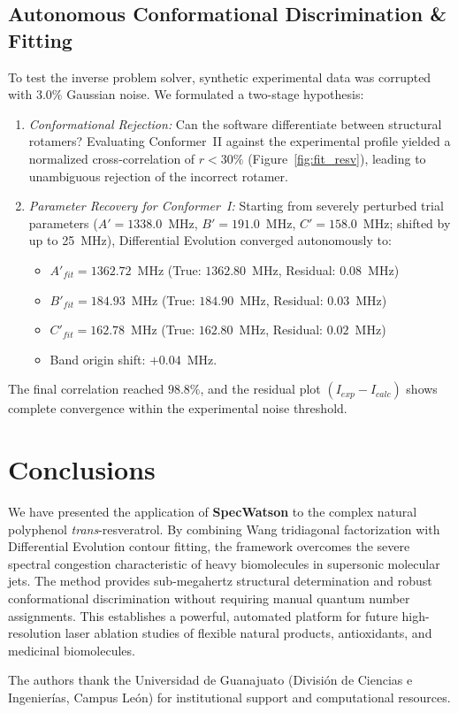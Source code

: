 \documentclass[aps,jcp,reprint,twocolumn,superscriptaddress,showpacs,amsmath,amssymb]{revtex4-2}
\begin{document}
\subsection{Autonomous Conformational Discrimination \& Fitting}
To test the inverse problem solver, synthetic experimental data was corrupted with $3.0\%$ Gaussian noise. We formulated a two-stage hypothesis:
\begin{enumerate}
    \item \textit{Conformational Rejection:} Can the software differentiate between structural rotamers? Evaluating Conformer~II against the experimental profile yielded a normalized cross-correlation of $r < 30\%$ (Figure~\ref{fig:fit_resv}), leading to unambiguous rejection of the incorrect rotamer.
    \item \textit{Parameter Recovery for Conformer~I:} Starting from severely perturbed trial parameters ($A' = 1338.0$~MHz, $B' = 191.0$~MHz, $C' = 158.0$~MHz; shifted by up to 25~MHz), Differential Evolution converged autonomously to:
    \begin{itemize}
        \item $A'_{fit} = 1362.72$~MHz (True: $1362.80$~MHz, Residual: $0.08$~MHz)
        \item $B'_{fit} = 184.93$~MHz (True: $184.90$~MHz, Residual: $0.03$~MHz)
        \item $C'_{fit} = 162.78$~MHz (True: $162.80$~MHz, Residual: $0.02$~MHz)
        \item Band origin shift: $+0.04$~MHz.
    \end{itemize}
\end{enumerate}

The final correlation reached $98.8\%$, and the residual plot $(I_{exp} - I_{calc})$ shows complete convergence within the experimental noise threshold.

\section{Conclusions}
We have presented the application of \textbf{SpecWatson} to the complex natural polyphenol \textit{trans}-resveratrol. By combining Wang tridiagonal factorization with Differential Evolution contour fitting, the framework overcomes the severe spectral congestion characteristic of heavy biomolecules in supersonic molecular jets. The method provides sub-megahertz structural determination and robust conformational discrimination without requiring manual quantum number assignments. This establishes a powerful, automated platform for future high-resolution laser ablation studies of flexible natural products, antioxidants, and medicinal biomolecules.

\begin{acknowledgments}
The authors thank the Universidad de Guanajuato (Divisi\'on de Ciencias e Ingenier\'ias, Campus Le\'on) for institutional support and computational resources.
\end{acknowledgments}


\end{document}
